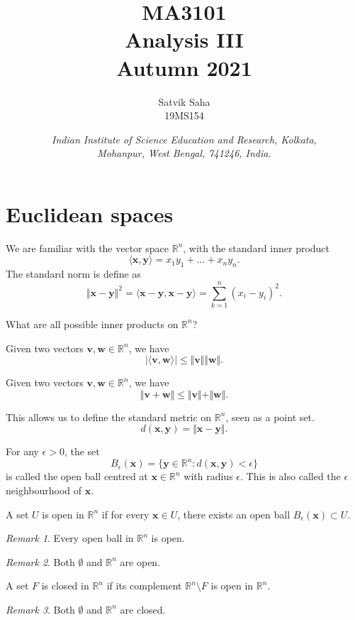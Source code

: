 \documentclass[11pt]{article}
\title{
    \Large\textsc{MA3101} \\
    \Huge \textbf{Analysis III} \\
    \vspace{5pt}
    \Large{Autumn 2021}
}
\author{
    \large Satvik Saha
    \\\textsc{\small 19MS154}
}
\date{\normalsize
    \textit{Indian Institute of Science Education and Research, Kolkata, \\
    Mohanpur, West Bengal, 741246, India.} \\
}
\newcommand{\R}{\mathbb{R}}
\newcommand{\ip}[2]{\langle #1, #2 \rangle}
\newcommand{\norm}[1]{\Vert #1 \Vert}
\renewcommand{\vec}[1]{\boldsymbol{#1}}
\newcommand{\vx}{\vec{x}}
\newcommand{\vy}{\vec{y}}
\newcommand{\vv}{\vec{v}}
\newcommand{\vw}{\vec{w}}
\theoremstyle{definition}
\theoremstyle{remark}
\newtheorem*{remark}{Remark}
\numberwithin{equation}{section}
\begin{document}
    \maketitle

    \tableofcontents

    \section{Euclidean spaces}
    We are familiar with the vector space $\R^n$, with the standard inner product \[
        \ip{\vx}{\vy} = x_1y_1 + \dots + x_ny_n.
    \] The standard norm is define as \[
        \norm{\vx - \vy}^2 = \ip{\vx - \vy}{\vx - \vy} = \sum_{k = 1}^n (x_i -
        y_i)^2.
    \]

    \begin{exercise}
        What are all possible inner products on $\R^n$?
    \end{exercise}

    \begin{theorem}
        Given two vectors $\vv, \vw \in \R^n$, we have \[
            |\ip{\vv}{\vw}| \leq \norm{\vv}\norm{\vw}.
        \] 
    \end{theorem}
    
    \begin{theorem}
        Given two vectors $\vv, \vw \in \R^n$, we have \[
            \norm{\vv + \vw} \leq \norm{\vv} + \norm{\vw}.
        \] 
    \end{theorem}
    This allows us to define the standard metric on $\R^n$, seen as a point set. \[
        d(\vx, \vy) = \norm{\vx - \vy}.
    \] 

    \begin{definition}
        For any $\epsilon > 0$, the set \[
            B_\epsilon(\vx) = \{\vy \in \R^n : d(\vx, \vy) < \epsilon\}
        \] is called the open ball centred at $\vx \in \R^n$ with radius $\epsilon$.
        This is also called the $\epsilon$ neighbourhood of $\vx$.
    \end{definition}

    \begin{definition}
        A set $U$ is open in $\R^n$ if for every $\vx \in U$, there exists an
        open ball $B_\epsilon(\vx) \subset U$.
        \begin{remark}
            Every open ball in $\R^n$ is open.
        \end{remark}
        \begin{remark}
            Both $\emptyset$ and $\R^n$ are open.
        \end{remark}
    \end{definition}
    
    \begin{definition}
        A set $F$ is closed in $\R^n$ if its complement $\R^n \setminus F$ is open in
        $\R^n$.
        \begin{remark}
            Both $\emptyset$ and $\R^n$ are closed.
        \end{remark}
    \end{definition}
    
\end{document}
